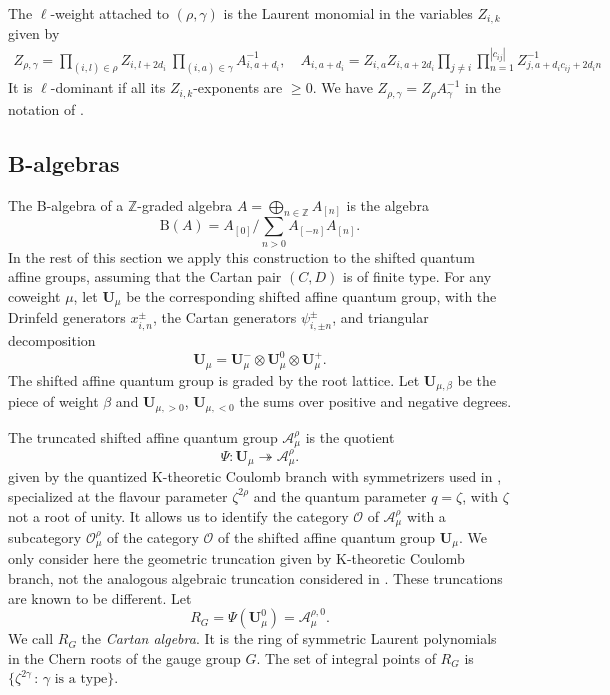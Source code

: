 \documentclass[11pt,reqno]{amsart}
\theoremstyle{definition}
\theoremstyle{remark}
\def\bbZ{\mathbb Z}
\def\scrO{\mathscr O}
\def\B{\mathrm B}
\def\calA{\mathcal A}
\def\bfU{\mathbf U}
\begin{document}
The $\ell$-weight attached to $(\rho,\gamma)$ is the Laurent monomial in the variables $Z_{i,k}$ given by
\begin{align}\label{ZRG}
Z_{\rho,\gamma}=\prod_{(i,l)\in\rho}Z_{i,l+2d_i}\ \prod_{(i,a)\in\gamma}A_{i,a+d_i}^{-1},\quad
A_{i,a+d_i}=Z_{i,a}Z_{i,a+2d_i}\prod_{j\neq i}\prod_{n=1}^{|c_{ij}|}Z_{j,a+d_ic_{ij}+2d_in}^{-1}
\end{align}
It is {$\ell$-dominant} if all its $Z_{i,k}$-exponents are $\geqslant0$.
We have $Z_{\rho,\gamma}=Z_\rho A_\gamma^{-1}$ in the notation of \cite{VVsh}.

\subsection{B-algebras}\label{subsec:algebras}
The B-algebra of a $\bbZ$-graded algebra $A=\bigoplus_{n\in\bbZ}A_{[n]}$ is the algebra
\[
\B(A)=A_{[0]}\Big/\sum_{n>0}A_{[-n]}A_{[n]}.
\]
 In the rest of this section we apply this construction to the shifted quantum affine groups,
 assuming that the Cartan pair
$(C,D)$ is of finite type. 
For any coweight $\mu$, let $\bfU_\mu$ be the corresponding shifted affine quantum group, with
the Drinfeld generators $x^\pm_{i,n}$, the Cartan generators $\psi^\pm_{i,\pm n}$, and triangular decomposition
$$\bfU_\mu=\bfU^-_\mu\otimes\bfU^0_\mu\otimes\bfU^+_\mu.$$
 The shifted affine quantum group is graded by the root lattice. 
 Let $\bfU_{\mu,\beta}$ be the
piece of weight $\beta$ and $\bfU_{\mu,>0}$, $\bfU_{\mu,<0}$ the sums over positive and negative degrees. 

The truncated shifted affine quantum group $\calA^\rho_\mu$ is the quotient 
$$\Psi:\bfU_\mu\twoheadrightarrow\calA^\rho_\mu.$$ 
given by the quantized K-theoretic Coulomb branch 
with symmetrizers used in \cite{VV25}, \cite{VVsh} specialized at the flavour parameter $\zeta^{2\rho}$ and the quantum parameter 
$q=\zeta$,  with $\zeta$ not a root of unity. 
It allows us to identify the category $\scrO$ of $\calA_\mu^\rho$ with a subcategory $\scrO_\mu^\rho$ of the category
$\scrO$ of the shifted affine quantum group $\bfU_\mu$.  
We only consider here the geometric truncation given by K-theoretic Coulomb branch, 
not the analogous algebraic truncation considered in \cite{H23}.
These truncations are known to be different.
Let 
$$R_G=\Psi(\bfU^0_\mu)=\calA^{\rho,0}_\mu.$$
We call $R_G$ the \emph{Cartan algebra}. It is the ring of symmetric Laurent polynomials in
the Chern roots of the gauge group $G$.
The set of integral points of $R_G$ is $\{\zeta^{2\gamma}\,:\,\gamma\text{ is a type}\}$.
\end{document}
